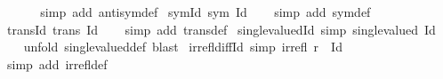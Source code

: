 \begin{isabellebody}
\ \ %
\isanewline
%
\isadelimproof
\ \ %
\endisadelimproof
%
\isatagproof
{}\isamarkupfalse%
\ {\isacharparenleft}{\kern0pt}simp\ add{\isacharcolon}{\kern0pt}\ antisym{\isacharunderscore}{\kern0pt}def{\isacharparenright}{\kern0pt}%
\endisatagproof
{\isafoldproof}%
%
\isadelimproof
\isanewline
%
\endisadelimproof
\isanewline
{}\isamarkupfalse%
\ sym{\isacharunderscore}{\kern0pt}Id{\isacharcolon}{\kern0pt}\ {\isachardoublequoteopen}sym\ Id{\isachardoublequoteclose}\isanewline
%
\isadelimproof
\ \ %
\endisadelimproof
%
\isatagproof
{}\isamarkupfalse%
\ {\isacharparenleft}{\kern0pt}simp\ add{\isacharcolon}{\kern0pt}\ sym{\isacharunderscore}{\kern0pt}def{\isacharparenright}{\kern0pt}%
\endisatagproof
{\isafoldproof}%
%
\isadelimproof
\isanewline
%
\endisadelimproof
\isanewline
{}\isamarkupfalse%
\ trans{\isacharunderscore}{\kern0pt}Id{\isacharcolon}{\kern0pt}\ {\isachardoublequoteopen}trans\ Id{\isachardoublequoteclose}\isanewline
%
\isadelimproof
\ \ %
\endisadelimproof
%
\isatagproof
{}\isamarkupfalse%
\ {\isacharparenleft}{\kern0pt}simp\ add{\isacharcolon}{\kern0pt}\ trans{\isacharunderscore}{\kern0pt}def{\isacharparenright}{\kern0pt}%
\endisatagproof
{\isafoldproof}%
%
\isadelimproof
\isanewline
%
\endisadelimproof
\isanewline
{}\isamarkupfalse%
\ single{\isacharunderscore}{\kern0pt}valued{\isacharunderscore}{\kern0pt}Id\ {\isacharbrackleft}{\kern0pt}simp{\isacharbrackright}{\kern0pt}{\isacharcolon}{\kern0pt}\ {\isachardoublequoteopen}single{\isacharunderscore}{\kern0pt}valued\ Id{\isachardoublequoteclose}\isanewline
%
\isadelimproof
\ \ %
\endisadelimproof
%
\isatagproof
{}\isamarkupfalse%
\ {\isacharparenleft}{\kern0pt}unfold\ single{\isacharunderscore}{\kern0pt}valued{\isacharunderscore}{\kern0pt}def{\isacharparenright}{\kern0pt}\ blast%
\endisatagproof
{\isafoldproof}%
%
\isadelimproof
\isanewline
%
\endisadelimproof
\isanewline
{}\isamarkupfalse%
\ irrefl{\isacharunderscore}{\kern0pt}diff{\isacharunderscore}{\kern0pt}Id\ {\isacharbrackleft}{\kern0pt}simp{\isacharbrackright}{\kern0pt}{\isacharcolon}{\kern0pt}\ {\isachardoublequoteopen}irrefl\ {\isacharparenleft}{\kern0pt}r\ {\isacharminus}{\kern0pt}\ Id{\isacharparenright}{\kern0pt}{\isachardoublequoteclose}\isanewline
%
\isadelimproof
\ \ %
\endisadelimproof
%
\isatagproof
{}\isamarkupfalse%
\ {\isacharparenleft}{\kern0pt}simp\ add{\isacharcolon}{\kern0pt}\ irrefl{\isacharunderscore}{\kern0pt}def{\isacharparenright}{\kern0pt}%

\end{isabellebody}
